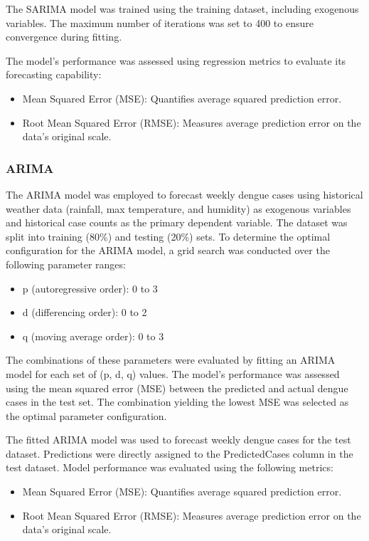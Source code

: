 The SARIMA model was trained using the training dataset, including exogenous variables. The maximum number of iterations was set to 400 to ensure convergence during fitting.

The model's performance was assessed using regression metrics to evaluate its forecasting capability:
\begin{itemize}
	\item Mean Squared Error (MSE): Quantifies average squared prediction error.
	\item Root Mean Squared Error (RMSE): Measures average prediction error on the data's original scale.
\end{itemize}

\subsubsection{ARIMA}
The ARIMA model was employed to forecast weekly dengue cases using historical weather data (rainfall, max temperature, and humidity) as exogenous variables and historical case counts as the primary dependent variable.
The dataset was split into training (80\%) and testing (20\%) sets. To determine the optimal configuration for the ARIMA model, a grid search was conducted over the following parameter ranges:
\begin{itemize}
	\item p (autoregressive order): 0 to 3
	\item d (differencing order): 0 to 2
	\item q (moving average order): 0 to 3
\end{itemize}
The combinations of these parameters were evaluated by fitting an ARIMA model for each set of (p, d, q) values. The model's performance was assessed using the mean squared error (MSE) between the predicted and actual dengue cases in the test set. The combination yielding the lowest MSE was selected as the optimal parameter configuration.

The fitted ARIMA model was used to forecast weekly dengue cases for the test dataset. Predictions were directly assigned to the PredictedCases column in the test dataset. Model performance was evaluated using the following metrics:
\begin{itemize}
	\item Mean Squared Error (MSE): Quantifies average squared prediction error.
	\item Root Mean Squared Error (RMSE): Measures average prediction error on the data's original scale.
\end{itemize}



